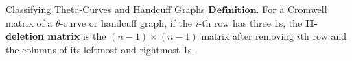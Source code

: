 \documentclass[final]{beamer}
\begin{document}
\begin{frame}[t]

\begin{columns}[t]
  \begin{block}{Classifying Theta-Curves and Handcuff Graphs}
    $\mathbf{Definition.}$ For a Cromwell matrix of a $\theta$-curve or handcuff graph, if the $i$-th row has three 1s,
    the \textbf{H-deletion matrix} is the $(n{-}1)\times(n{-}1)$ matrix after removing $i$th row and the columns of its leftmost and rightmost 1s.


\end{block}
\end{columns}
\end{frame}
\end{document}
